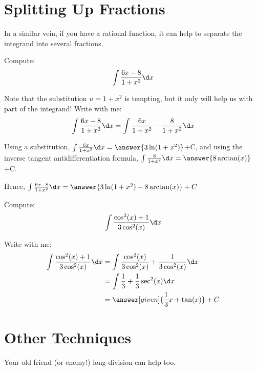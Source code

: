 \documentclass[nooutcomes]{ximera}
\begin{document}
\section{Splitting Up Fractions}

In a similar vein, if you have a rational function, it can help to separate the
integrand into several fractions.

\begin{example}
  Compute:
  \[
  \int \frac{6x-8}{1+x^2}\d x
  \]
 
  \begin{explanation}
    Note that the substitution $u= 1+x^2$ is tempting, but it only will help us with part of the integrand!  Write with me:
    \[ \int \frac{6x-8}{1+x^2}\d x = \int \frac{6x}{1+x^2}-\frac{8}{1+x^2} \d x \]
      
Using a substitution, $ \int \frac{6x}{1+x^2}\d x = \answer{3 \ln(1+x^2)}$+C, and using the inverse tangent antidifferentiation formula, $ \int \frac{8}{1+x^2}\d x = \answer{8 \arctan(x)}$+C.

Hence, $\int \frac{6x-8}{1+x^2}\d x =  \answer{3 \ln(1+x^2)- 8 \arctan(x)}+C$
  \end{explanation}
\end{example}

\begin{example}
  Compute:
  \[
  \int \frac{\cos^2(x)+1}{3 \cos^2(x)}\d x
  \]
 
  \begin{explanation}
    Write with me:
    \begin{align*}
    \int \frac{\cos^2(x)+1}{3 \cos^2(x)}\d x &=  \int \frac{\cos^2(x)}{3 \cos^2(x)} +  \frac{1}{3 \cos^2(x)}\d x \\
    &= \int \frac{1}{3} + \frac{1}{3} \sec^2(x) \d x \\
    & = \answer[given]{\frac{1}{3}x+\tan(x)}+C 
    \end{align*}
      
  \end{explanation}
\end{example}


\section{Other Techniques}
Your old friend (or enemy!) long-division can help too.
\end{document}
